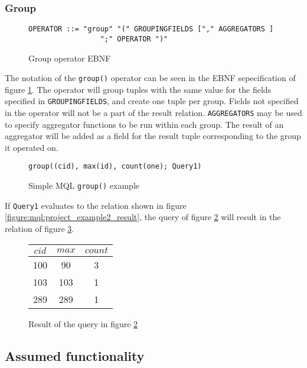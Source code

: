 \subsubsection{Group}

\begin{figure}[h]
\begin{Verbatim}
OPERATOR ::= "group" "(" GROUPINGFIELDS ["," AGGREGATORS ] 
                 ";" OPERATOR ")"
\end{Verbatim}
\label{figure:mql:groupEBNF}
\caption{Group operator EBNF}
\end{figure}

The notation of the \texttt{group()} operator can be seen in the EBNF sepecification of figure
\ref{figure:mql:groupEBNF}. The operator will group tuples with the same value for the fields specified in
\texttt{GROUPINGFIELDS}, and create one tuple per group. Fields not specified in the operator will not be a part
of the result relation. \texttt{AGGREGATORS} may be used to specify aggregator functions to be run within each
group. The result of an aggregator will be added as a field for the result tuple corresponding to the group it
operated on.

\begin{figure}[h]
\begin{Verbatim}
group((cid), max(id), count(one); Query1)
\end{Verbatim}
\caption{Simple MQL \texttt{group()} example}
\label{figure:mql:groupEx}
\end{figure}

If \texttt{Query1} evaluates to the relation shown in figure \ref{figure:mql:project_example2_result}, the query
of figure \ref{figure:mql:groupEx} will result in the relation of figure \ref{figure:mql:groupres}.

\begin{figure}[!h]
\centering
\begin{tabular}{|c|c|c|} \hline
$cid$ & $max$ & $count$ \\ \hline
100 & 90 & 3 \\ \hline
103 & 103 & 1 \\ \hline
289 & 289 & 1 \\ \hline
\end{tabular}
\caption{Result of the query in figure \ref{figure:mql:groupEx}}
\label{figure:mql:groupres}
\end{figure}



\subsection{Assumed functionality}
\label{sect:method:marsAddedOperators}

